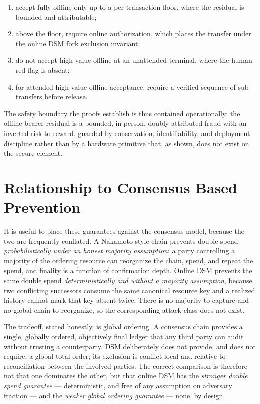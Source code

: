 \documentclass[11pt]{article}
\theoremstyle{definition}
\theoremstyle{remark}
\begin{document}
\begin{enumerate}[label=(\arabic*),leftmargin=2em]
\item accept fully offline only up to a per transaction floor, where the residual is bounded and
attributable;
\item above the floor, require online authorization, which places the transfer under the online DSM
fork exclusion invariant;
\item do not accept high value offline at an unattended terminal, where the human red flag is absent;
\item for attended high value offline acceptance, require a verified sequence of sub transfers before
release.
\end{enumerate}

The safety boundary the proofs establish is thus contained operationally: the offline bearer residual
is a bounded, in person, doubly attributed fraud with an inverted risk to reward, guarded by
conservation, identifiability, and deployment discipline rather than by a hardware primitive that, as
shown, does not exist on the secure element.

\section{Relationship to Consensus Based Prevention}

It is useful to place these guarantees against the consensus model, because the two are frequently
conflated. A Nakamoto style chain prevents double spend \emph{probabilistically under an honest
majority assumption}: a party controlling a majority of the ordering resource can reorganize the chain,
spend, and repeat the spend, and finality is a function of confirmation depth. Online DSM prevents the
same double spend \emph{deterministically and without a majority assumption}, because two conflicting
successors consume the same canonical resource key and a realized history cannot mark that key absent
twice. There is no majority to capture and no global chain to reorganize, so the corresponding attack
class does not exist.

The tradeoff, stated honestly, is global ordering. A consensus chain provides a single, globally
ordered, objectively final ledger that any third party can audit without trusting a counterparty. DSM
deliberately does not provide, and does not require, a global total order; its exclusion is conflict
local and relative to reconciliation between the involved parties. The correct comparison is therefore
not that one dominates the other, but that online DSM has the \emph{stronger double spend guarantee}
--- deterministic, and free of any assumption on adversary fraction --- and the \emph{weaker global
ordering guarantee} --- none, by design.
\end{document}
